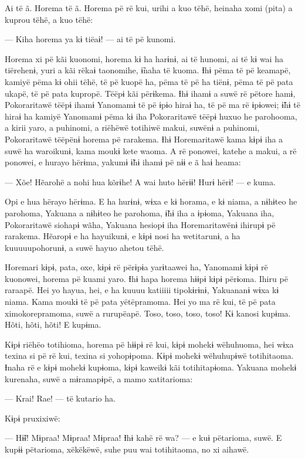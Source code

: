  

 

Ai të ã. Horema të ã. Horema pë rë kui, urihi a kuo tëhë, heinaha xomi
(pita) a kuprou tëhë, a kuo tëhë:

--- Kiha horema ya kɨ tiëaɨ! --- ai të pë kunomi. 

Horema xi pë kãi kuonomi, horema kɨ ha harɨnɨ, ai të hunomi, ai të kɨ
wai ha tiërehenɨ, yuri a kãi rëkaɨ taonomihe, ɨ̃naha të kuoma. Ɨhɨ pëma
të pë keamapë, kamiyë pëma kɨ ohii tëhë, të pë kuopë ha, pëma të pë ha
tiënɨ, pëma të pë pata ukapë, të pë pata kupropë. Tëëpɨ kãi përɨkema.
Ɨhɨ ihamɨ a suwë rë pëtore hamɨ, Pokoraritawë tëëpɨ ihamɨ Yanomamɨ të pë
ɨpɨo hiraɨ ha, të pë ma rë ɨpɨowei; ɨ̃hɨ të hiraɨ ha kamiyë Yanomamɨ pëma
kɨ iha Pokoraritawë tëëpɨ huxuo he parohooma, a kirii yaro, a puhinomi,
a riëhëwë totihiwë makui, suwënɨ a puhinomi, Pokoraritawë tëëpënɨ horema
pë rarakema. Ɨhɨ Horemaritawë kama kɨpɨ iha a suwë ha waroikunɨ, kama
moukɨ kete waoma. A rë ponowei, katehe a makui, a rë ponowei, e hurayo
hërɨma, yakumɨ ɨ̃hɨ ihamɨ pë nɨɨ e ã haɨ heama: 

--- Xõe! Hẽarohë a nohi hua kõrɨhe! A wai huto hërɨɨ! Hurɨ hërɨ! --- e
kuma. 

Opi e hua hërayo hërɨma. E ha hurɨnɨ, wɨxa e kɨ horama, e kɨ niama, a
nɨhɨteo he parohoma, Yakuana a nɨhɨteo he parohoma, ɨ̃hɨ iha a ɨpɨoma,
Yakuana iha, Pokoraritawë siohapɨ wãha, Yakuana hesiopɨ iha
Horemaritawënɨ ihirupɨ pë rarakema. Hẽaropɨ e ha hayuikunɨ, e kɨpɨ nosi
ha wetitarunɨ, a ha kuuuuupohorunɨ, a suwë hayuo ahetou tëhë. 

Horemari kɨpɨ, pata, oxe, kɨpɨ rë përɨpɨa yarɨtaawei ha, Yanomamɨ kɨpɨ
rë kuonowei, horema pë kuami yaro. Ɨhɨ hapa horema hɨɨpɨ kɨpɨ përɨoma.
Ihiru pë raraapë. Hei yo hayua, hei, e ha kuuuu katiiiii tipokɨrɨnɨ,
Yakuananɨ wɨxa kɨ niama. Kama moukɨ të pë pata yëtëpramoma. Hei yo ma rë
kui, të pë pata ximokorepramoma, suwë a rurupëapë. Toso, toso, toso,
toso! Kɨ kanosi kupɨma. Hõti, hõti, hõti! E kupɨma. 

Kɨpɨ riëhëo totihioma, horema pë hɨɨpɨ rë kui, kɨpɨ mohekɨ wëhuhuoma,
hei wɨxa texina si pë rë kui, texina si yohopɨpoma. Kɨpɨ mohekɨ
wëhuhupɨwë totihitaoma. Ɨnaha rë e kɨpɨ mohekɨ kupɨoma, kɨpɨ kaweikɨ kãi
totihitapɨoma. Yakuana mohekɨ kurenaha, suwë a mɨramapɨpë, a mamo
xatitarioma: 

--- Krai! Rae! --- të kutario ha. 

Kɨpɨ pruxixiwë: 

--- Hɨ̃ɨ! Mɨpraa! Mɨpraa! Mɨpraa! Ɨhɨ kahë rë wa? --- e kuɨ pëtarioma,
suwë. E kupɨɨ pëtarioma, xëkëkëwë, suhe puu wai totihitaoma, no xi
aihawë. 

